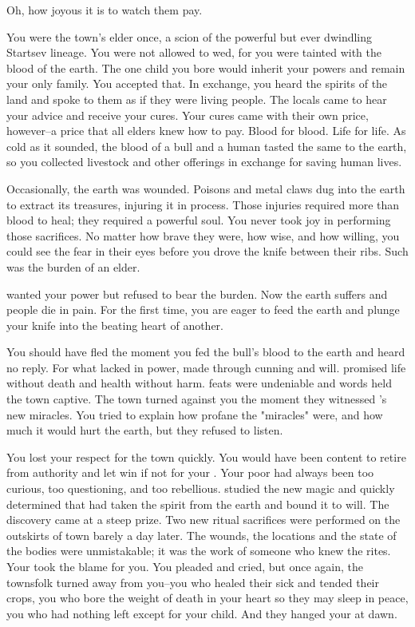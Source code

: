 \documentclass[char]{Pestilence}
\begin{document}
\name{\cShaman{}}

Oh, how joyous it is to watch them pay.

You were the town's elder once, a scion of the powerful but ever dwindling Startsev lineage. You were not allowed to wed, for you were tainted with the blood of the earth. The one child you bore would inherit your powers and remain your only family. You accepted that. In exchange, you heard the spirits of the land and spoke to them as if they were living people. The locals came to hear your advice and receive your cures. Your cures came with their own price, however--a price that all elders knew how to pay. Blood for blood. Life for life. As cold as it sounded, the blood of a bull and a human tasted the same to the earth, so you collected livestock and other offerings in exchange for saving human lives. 

Occasionally, the earth was wounded. Poisons and metal claws dug into the earth to extract its treasures, injuring it in process. Those injuries required more than blood to heal; they required a powerful soul. You never took joy in performing those sacrifices. No matter how brave they were, how wise, and how willing, you could see the fear in their eyes before you drove the knife between their ribs. Such was the burden of an elder. 

\cElder{\intro} wanted your power but refused to bear the burden. Now the earth suffers and \cElder{\their} people die in pain. For the first time, you are eager to feed the earth and plunge your knife into the beating heart of another.

You should have fled the moment you fed the bull's blood to the earth and heard no reply. For what \cElder{\they} lacked in power, \cElder{} made through cunning and will. \cElder{} promised life without death and health without harm. \cElder{\Their} feats were undeniable and \cElder{\their} words held the town captive. The town turned against you the moment they witnessed \cElder{}'s new miracles. You tried to explain how profane the "miracles" were, and how much it would hurt the earth, but they refused to listen. 

You lost your respect for the town quickly. You would have been content to retire from authority and let \cElder{} win if not for your \cPlaguebearer{\offspring}. Your poor \cPlaguebearer{} had always been too curious, too questioning, and too rebellious. \cPlaguebearer{\They} studied the new magic and quickly determined that \cElder{} had taken the spirit from the earth and bound it to \cElder{\their} will. The discovery came at a steep prize. Two new ritual sacrifices were performed on the outskirts of town barely a day later. The wounds, the locations and the state of the bodies were unmistakable; it was the work of someone who knew the rites. Your \cPlaguebearer{\offspring} took the blame for you. You pleaded and cried, but once again, the townsfolk turned away from you--you who healed their sick and tended their crops, you who bore the weight of death in your heart so they may sleep in peace, you who had nothing left except for your child. And they hanged your \cPlaguebearer{} at dawn.
\end{document}
